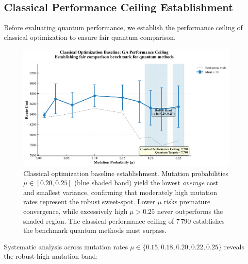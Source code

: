 \subsection{Classical Performance Ceiling Establishment}

Before evaluating quantum performance, we establish the performance ceiling of classical optimization to ensure fair quantum comparison.


\begin{figure}[htb]
    \centering
    \includegraphics[width=0.8\linewidth]{figures/01_ga_mutation_sweep.png}
    \caption{Classical optimization baseline establishment. Mutation probabilities $\mu \in [0.20, 0.25]$ (blue shaded band) yield the lowest \emph{average} cost and smallest variance, confirming that moderately high mutation rates represent the robust sweet-spot. Lower $\mu$ risks premature convergence, while excessively high $\mu > 0.25$ never outperforms the shaded region. The classical performance ceiling of 7\,790 establishes the benchmark quantum methods must surpass.}
    \label{fig:ga_mutation}
\end{figure}

Systematic analysis across mutation rates $\mu \in \{0.15, 0.18, 0.20, 0.22, 0.25\}$ reveals the robust high-mutation band:

